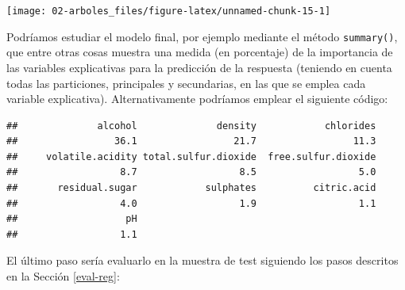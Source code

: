 \documentclass[
]{book}
\newenvironment{Shaded}{\begin{snugshade}}{\end{snugshade}}
\newcommand{\AttributeTok}[1]{\textcolor[rgb]{0.77,0.63,0.00}{#1}}
\newcommand{\CommentTok}[1]{\textcolor[rgb]{0.56,0.35,0.01}{\textit{#1}}}
\newcommand{\DecValTok}[1]{\textcolor[rgb]{0.00,0.00,0.81}{#1}}
\newcommand{\FunctionTok}[1]{\textcolor[rgb]{0.00,0.00,0.00}{#1}}
\newcommand{\NormalTok}[1]{#1}
\newcommand{\OtherTok}[1]{\textcolor[rgb]{0.56,0.35,0.01}{#1}}
\newcommand{\SpecialCharTok}[1]{\textcolor[rgb]{0.00,0.00,0.00}{#1}}
\newcommand{\StringTok}[1]{\textcolor[rgb]{0.31,0.60,0.02}{#1}}
\theoremstyle{break}
\theoremstyle{definition}
\theoremstyle{definition}
\theoremstyle{definition}
\theoremstyle{definition}
\theoremstyle{remark}
\begin{document}
\begin{center}\texttt{[image: 02-arboles\_files/figure-latex/unnamed-chunk-15-1]} \end{center}

Podríamos estudiar el modelo final, por ejemplo mediante el método \texttt{summary()}, que entre otras cosas muestra una medida (en porcentaje) de la importancia de las variables explicativas para la predicción de la respuesta (teniendo en cuenta todas las particiones, principales y secundarias, en las que se emplea cada variable explicativa).
Alternativamente podríamos emplear el siguiente código:

\begin{Shaded}
\end{Shaded}

\begin{verbatim}
##              alcohol              density            chlorides 
##                 36.1                 21.7                 11.3 
##     volatile.acidity total.sulfur.dioxide  free.sulfur.dioxide 
##                  8.7                  8.5                  5.0 
##       residual.sugar            sulphates          citric.acid 
##                  4.0                  1.9                  1.1 
##                   pH 
##                  1.1
\end{verbatim}

El último paso sería evaluarlo en la muestra de test siguiendo los pasos descritos en la Sección \ref{eval-reg}:

\begin{Shaded}
\end{Shaded}
\end{document}
